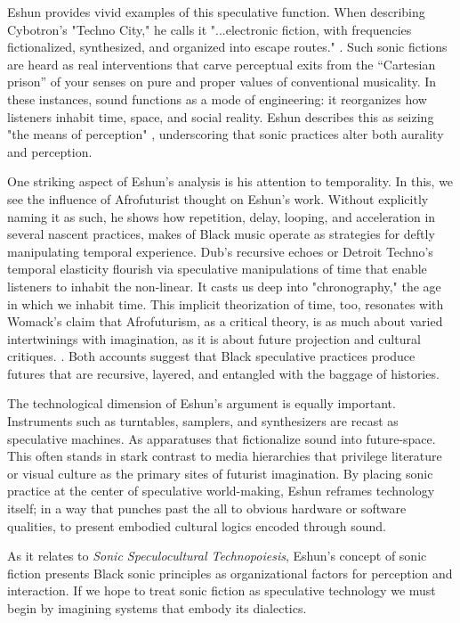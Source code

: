Eshun provides vivid examples of this speculative function. When describing Cybotron’s "Techno City," he calls it "...electronic fiction, with frequencies fictionalized, synthesized, and organized into escape routes." \parencite[p. 103]{Eshun_1999}. Such sonic fictions are heard as real interventions that carve perceptual exits from the “Cartesian prison” of your senses on pure and proper values of conventional musicality. In these instances, sound functions as a mode of engineering: it reorganizes how listeners inhabit time, space, and social reality. Eshun describes this as seizing "the means of perception" \parencite[p. 32]{Eshun_1999}, underscoring that sonic practices alter both aurality and perception.  

One striking aspect of Eshun’s analysis is his attention to temporality. In this, we see the influence of Afrofuturist thought on Eshun's work. Without explicitly naming it as such, he shows how repetition, delay, looping, and acceleration in several nascent practices, makes of Black music operate as strategies for deftly manipulating temporal experience. Dub’s recursive echoes or Detroit Techno’s temporal elasticity flourish via speculative manipulations of time that enable listeners to inhabit the non-linear. It casts us deep into "chronography," the age in which we inhabit time. \parencite[p. 101]{Eshun_1999} This implicit theorization of time, too, resonates with Womack's claim that Afrofuturism, as a critical theory, is as much about varied intertwinings with imagination, as it is about future projection and cultural critiques. \parencite[p. 9]{Womack_2013}. Both accounts suggest that Black speculative practices produce futures that are recursive, layered, and entangled with the baggage of histories.  

The technological dimension of Eshun’s argument is equally important. Instruments such as turntables, samplers, and synthesizers are recast as speculative machines. As apparatuses that fictionalize sound into future-space. This often stands in stark contrast to media hierarchies that privilege literature or visual culture as the primary sites of futurist imagination. By placing sonic practice at the center of speculative world-making, Eshun reframes technology itself; in a way that punches past the all to obvious hardware or software qualities, to present embodied cultural logics encoded through sound.  

As it relates to \emph{Sonic Speculocultural Technopoiesis}, Eshun's concept of sonic fiction presents Black sonic principles as organizational factors for perception and interaction. If we hope to treat sonic fiction as speculative technology we must begin by imagining systems that embody its dialectics.  
  


